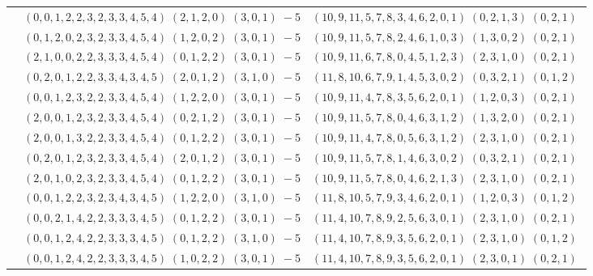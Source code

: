\documentclass[11pt]{article}
\begin{document}
\begin{longtable}[l]{|c|c|c|}
 \cline{2-3} 
 & $(0 ,0 ,1 ,2 ,2 ,3 ,2 ,3 ,3 ,4 ,5 ,4) \;(2 ,1 ,2 ,0) \;(3 ,0 ,1) \;-5$ & $(10 ,9 ,11 ,5 ,7 ,8 ,3 ,4 ,6 ,2 ,0 ,1) \;(0 ,2 ,1 ,3) \;(0 ,2 ,1) \;$\\ 
 \cline{2-3} 
 & $(0 ,1 ,2 ,0 ,2 ,3 ,2 ,3 ,3 ,4 ,5 ,4) \;(1 ,2 ,0 ,2) \;(3 ,0 ,1) \;-5$ & $(10 ,9 ,11 ,5 ,7 ,8 ,2 ,4 ,6 ,1 ,0 ,3) \;(1 ,3 ,0 ,2) \;(0 ,2 ,1) \;$\\ 
 \cline{2-3} 
 & $(2 ,1 ,0 ,0 ,2 ,2 ,3 ,3 ,3 ,4 ,5 ,4) \;(0 ,1 ,2 ,2) \;(3 ,0 ,1) \;-5$ & $(10 ,9 ,11 ,6 ,7 ,8 ,0 ,4 ,5 ,1 ,2 ,3) \;(2 ,3 ,1 ,0) \;(0 ,2 ,1) \;$\\ 
 \cline{2-3} 
 & $(0 ,2 ,0 ,1 ,2 ,2 ,3 ,3 ,4 ,3 ,4 ,5) \;(2 ,0 ,1 ,2) \;(3 ,1 ,0) \;-5$ & $(11 ,8 ,10 ,6 ,7 ,9 ,1 ,4 ,5 ,3 ,0 ,2) \;(0 ,3 ,2 ,1) \;(0 ,1 ,2) \;$\\ 
 \cline{2-3} 
 & $(0 ,0 ,1 ,2 ,3 ,2 ,2 ,3 ,3 ,4 ,5 ,4) \;(1 ,2 ,2 ,0) \;(3 ,0 ,1) \;-5$ & $(10 ,9 ,11 ,4 ,7 ,8 ,3 ,5 ,6 ,2 ,0 ,1) \;(1 ,2 ,0 ,3) \;(0 ,2 ,1) \;$\\ 
 \cline{2-3} 
 & $(2 ,0 ,0 ,1 ,2 ,3 ,2 ,3 ,3 ,4 ,5 ,4) \;(0 ,2 ,1 ,2) \;(3 ,0 ,1) \;-5$ & $(10 ,9 ,11 ,5 ,7 ,8 ,0 ,4 ,6 ,3 ,1 ,2) \;(1 ,3 ,2 ,0) \;(0 ,2 ,1) \;$\\ 
 \cline{2-3} 
 & $(2 ,0 ,0 ,1 ,3 ,2 ,2 ,3 ,3 ,4 ,5 ,4) \;(0 ,1 ,2 ,2) \;(3 ,0 ,1) \;-5$ & $(10 ,9 ,11 ,4 ,7 ,8 ,0 ,5 ,6 ,3 ,1 ,2) \;(2 ,3 ,1 ,0) \;(0 ,2 ,1) \;$\\ 
 \cline{2-3} 
 & $(0 ,2 ,0 ,1 ,2 ,3 ,2 ,3 ,3 ,4 ,5 ,4) \;(2 ,0 ,1 ,2) \;(3 ,0 ,1) \;-5$ & $(10 ,9 ,11 ,5 ,7 ,8 ,1 ,4 ,6 ,3 ,0 ,2) \;(0 ,3 ,2 ,1) \;(0 ,2 ,1) \;$\\ 
 \cline{2-3} 
 & $(2 ,0 ,1 ,0 ,2 ,3 ,2 ,3 ,3 ,4 ,5 ,4) \;(0 ,1 ,2 ,2) \;(3 ,0 ,1) \;-5$ & $(10 ,9 ,11 ,5 ,7 ,8 ,0 ,4 ,6 ,2 ,1 ,3) \;(2 ,3 ,1 ,0) \;(0 ,2 ,1) \;$\\ 
 \cline{2-3} 
 & $(0 ,0 ,1 ,2 ,2 ,3 ,2 ,3 ,4 ,3 ,4 ,5) \;(1 ,2 ,2 ,0) \;(3 ,1 ,0) \;-5$ & $(11 ,8 ,10 ,5 ,7 ,9 ,3 ,4 ,6 ,2 ,0 ,1) \;(1 ,2 ,0 ,3) \;(0 ,1 ,2) \;$\\ 
 \cline{2-3} 
 & $(0 ,0 ,2 ,1 ,4 ,2 ,2 ,3 ,3 ,3 ,4 ,5) \;(0 ,1 ,2 ,2) \;(3 ,0 ,1) \;-5$ & $(11 ,4 ,10 ,7 ,8 ,9 ,2 ,5 ,6 ,3 ,0 ,1) \;(2 ,3 ,1 ,0) \;(0 ,2 ,1) \;$\\ 
 \cline{2-3} 
 & $(0 ,0 ,1 ,2 ,4 ,2 ,2 ,3 ,3 ,3 ,4 ,5) \;(0 ,1 ,2 ,2) \;(3 ,1 ,0) \;-5$ & $(11 ,4 ,10 ,7 ,8 ,9 ,3 ,5 ,6 ,2 ,0 ,1) \;(2 ,3 ,1 ,0) \;(0 ,1 ,2) \;$\\ 
 \cline{2-3} 
 & $(0 ,0 ,1 ,2 ,4 ,2 ,2 ,3 ,3 ,3 ,4 ,5) \;(1 ,0 ,2 ,2) \;(3 ,0 ,1) \;-5$ & $(11 ,4 ,10 ,7 ,8 ,9 ,3 ,5 ,6 ,2 ,0 ,1) \;(2 ,3 ,0 ,1) \;(0 ,2 ,1) \;$\\ 

\end{longtable}
\end{document}
